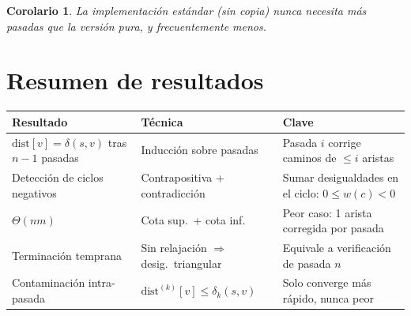 \documentclass[11pt, letterpaper]{article}
\theoremstyle{definition}
\theoremstyle{plain}
\newtheorem{corollary}[theorem]{Corolario}
\theoremstyle{remark}
\begin{document}
\begin{corollary}
La implementación estándar (sin copia) nunca necesita más pasadas que
la versión pura, y frecuentemente menos.
\end{corollary}

\section{Resumen de resultados}

\begin{table}[h]
\centering
\begin{tabular}{llp{5.5cm}}
\toprule
\textbf{Resultado} & \textbf{Técnica} & \textbf{Clave} \\
\midrule
$\mathrm{dist}[v] = \delta(s,v)$ tras $n{-}1$ pasadas
  & Inducción sobre pasadas
  & Pasada $i$ corrige caminos de $\leq i$ aristas \\
Detección de ciclos negativos
  & Contrapositiva + contradicción
  & Sumar desigualdades en el ciclo: $0 \leq w(c) < 0$ \\
$\Theta(nm)$
  & Cota sup.\ + cota inf.
  & Peor caso: 1 arista corregida por pasada \\
Terminación temprana
  & Sin relajación $\Rightarrow$ desig.\ triangular
  & Equivale a verificación de pasada $n$ \\
Contaminación intra-pasada
  & $\mathrm{dist}^{(k)}[v] \leq \delta_k(s,v)$
  & Solo converge más rápido, nunca peor \\
\bottomrule
\end{tabular}
\end{table}
\end{document}

